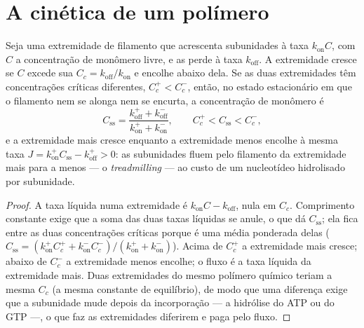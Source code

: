 \section{A cinética de um polímero}

\begin{theorem}\label{thm:b3:cytoskeleton-motility:treadmilling}
Seja uma extremidade de filamento que acrescenta subunidades à taxa
$k_{\text{on}}C$, com $C$ a concentração de monômero livre, e as perde
à taxa $k_{\text{off}}$. A extremidade cresce se $C$ excede sua
\emph{} $C_{c} = k_{\text{off}}/k_{\text{on}}$ e
encolhe abaixo dela. Se as duas extremidades têm concentrações críticas
diferentes, $C_{c}^{+}
< C_{c}^{-}$, então, no estado estacionário em
que o filamento nem se alonga nem se encurta, a concentração de
monômero é
\[
C_{\text{ss}} = \frac{k_{\text{off}}^{+} + k_{\text{off}}^{-}}
{k_{\text{on}}^{+} + k_{\text{on}}^{-}},
\qquad C_{c}^{+} < C_{\text{ss}} < C_{c}^{-},
\]
e a extremidade mais cresce enquanto a extremidade menos encolhe à
mesma taxa $J = k_{\text{on}}^{+}C_{\text{ss}} - k_{\text{off}}^{+} > 0$: as subunidades fluem pelo filamento da extremidade mais para a
menos --- o \emph{treadmilling} --- ao custo de um nucleotídeo
hidrolisado por subunidade.
\end{theorem}
\begin{proof}
A taxa líquida numa extremidade é $k_{\text{on}}C - k_{\text{off}}$,
nula em $C_{c}$. Comprimento constante exige que a soma das duas taxas
líquidas se anule, o que dá $C_{\text{ss}}$; ela fica entre as duas
concentrações críticas porque é uma média ponderada delas
($C_{\text{ss}} =
(k_{\text{on}}^{+}C_{c}^{+} + k_{\text{on}}^{-}C_{c}^{-})/(k_{\text{on}}^{+}
+ k_{\text{on}}^{-})$). Acima de $C_{c}^{+}$ a extremidade mais cresce;
abaixo de $C_{c}^{-}$ a extremidade menos encolhe; o fluxo é a taxa
líquida da extremidade mais. Duas extremidades do mesmo polímero
químico teriam a mesma $C_{c}$ (a mesma constante de equilíbrio), de
modo que uma diferença exige que a subunidade mude depois da
incorporação --- a hidrólise do ATP ou do GTP ---, o que faz as
extremidades diferirem e paga pelo fluxo.
\end{proof}

